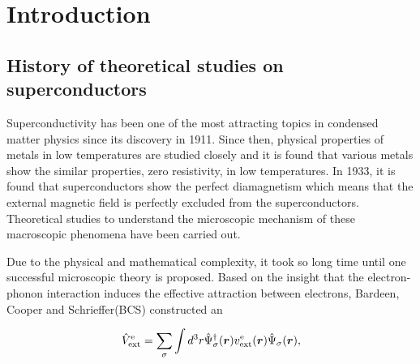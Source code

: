

%
%
\chapter{Introduction}



\section{History of theoretical studies on superconductors}
Superconductivity has been one of the most attracting topics in condensed matter physics since its
discovery in 1911\cite{Onnes1911}. Since then, physical properties of metals in low temperatures are
studied closely and it is found that various metals show the similar properties, 
zero resistivity, in low temperatures. In 1933\cite{Meissner1933}, it is found that
superconductors show the perfect diamagnetism which means that the external magnetic field is 
perfectly excluded from the superconductors. Theoretical studies to understand the microscopic 
mechanism of these macroscopic phenomena have been carried out.

Due to the physical and mathematical complexity, it took so long time until one successful
microscopic theory is proposed. Based on the insight that the electron-phonon interaction induces
the effective attraction between electrons\cite{Froehlich1950}, Bardeen, Cooper and Schrieffer(BCS)
constructed an 




\begin{equation} %
	\hat{V}^\mathrm{e}_\mathrm{ext} = \sum_{\sigma}\int d^3r\hat{\Psi}^\dag_{\sigma}({\bm r})
	                                                            v^\mathrm{e}_{\rm ext}(\bm{r})\hat{\Psi}_{\sigma}(\bm{r}), 
\end{equation} 



